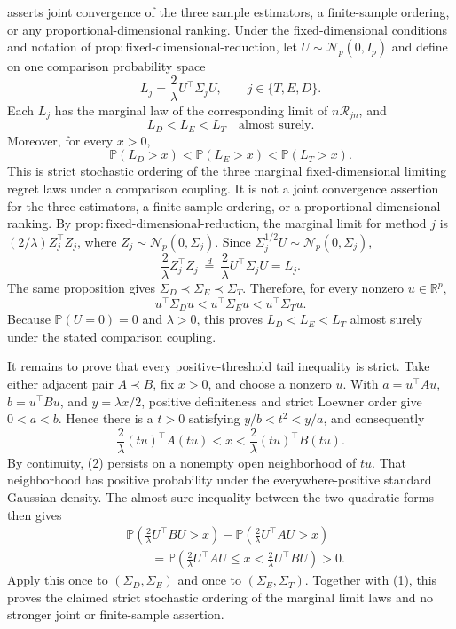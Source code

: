 asserts joint convergence of the three sample estimators, a finite-sample
ordering, or any proportional-dimensional ranking.
Under the fixed-dimensional conditions and notation of
\(\mathrm{prop{:}fixed\mbox{-}dimensional\mbox{-}reduction}\), let
\(U\sim\mathcal N_p(0,I_p)\) and define on one comparison probability space
\[
 L_j=\frac2\lambda U^\top\Sigma_jU,
 \qquad j\in\{T,E,D\}.
\]
Each \(L_j\) has the marginal law of the corresponding limit of
\(n\mathcal R_{jn}\), and
\[
 L_D<L_E<L_T\quad\text{almost surely}.
\]
Moreover, for every \(x>0\),
\[
 \mathbb P(L_D>x)<\mathbb P(L_E>x)<\mathbb P(L_T>x).
\]
This is strict stochastic ordering of the three marginal fixed-dimensional
limiting regret laws under a comparison coupling.  It is not a joint
convergence assertion for the three estimators, a finite-sample ordering, or
a proportional-dimensional ranking.
By \(\mathrm{prop{:}fixed\mbox{-}dimensional\mbox{-}reduction}\), the
marginal limit for method \(j\) is
\((2/\lambda)Z_j^\top Z_j\), where
\(Z_j\sim\mathcal N_p(0,\Sigma_j)\).  Since
\(\Sigma_j^{1/2}U\sim\mathcal N_p(0,\Sigma_j)\),
\[
 \frac2\lambda Z_j^\top Z_j
 \ \overset{d}=\ 
 \frac2\lambda U^\top\Sigma_jU=L_j.
 \tag{1}
\]
The same proposition gives
\(\Sigma_D\prec\Sigma_E\prec\Sigma_T\).  Therefore, for every nonzero
\(u\in\mathbb R^p\),
\[
 u^\top\Sigma_Du<u^\top\Sigma_Eu<u^\top\Sigma_Tu.
\]
Because \(\mathbb P(U=0)=0\) and \(\lambda>0\), this proves
\(L_D<L_E<L_T\) almost surely under the stated comparison coupling.

It remains to prove that every positive-threshold tail inequality is strict.
Take either adjacent pair \(A\prec B\), fix \(x>0\), and choose a nonzero
\(u\).  With
\(a=u^\top Au\), \(b=u^\top Bu\), and \(y=\lambda x/2\), positive
definiteness and strict Loewner order give \(0<a<b\).  Hence there is a
\(t>0\) satisfying \(y/b<t^2<y/a\), and consequently
\[
 \frac2\lambda (tu)^\top A(tu)<x<
 \frac2\lambda (tu)^\top B(tu).
 \tag{2}
\]
By continuity, (2) persists on a nonempty open neighborhood of \(tu\).  That
neighborhood has positive probability under the everywhere-positive standard
Gaussian density.  The almost-sure inequality between the two quadratic
forms then gives
\[
 \begin{aligned}
 &\mathbb P\!\left(\frac2\lambda U^\top BU>x\right)
 -\mathbb P\!\left(\frac2\lambda U^\top AU>x\right)\\
 &\qquad=
 \mathbb P\!\left(
  \frac2\lambda U^\top AU\le x<\frac2\lambda U^\top BU
 \right)>0.
 \end{aligned}
\]
Apply this once to \((\Sigma_D,\Sigma_E)\) and once to
\((\Sigma_E,\Sigma_T)\).  Together with (1), this proves the claimed strict
stochastic ordering of the marginal limit laws and no stronger joint or
finite-sample assertion.
